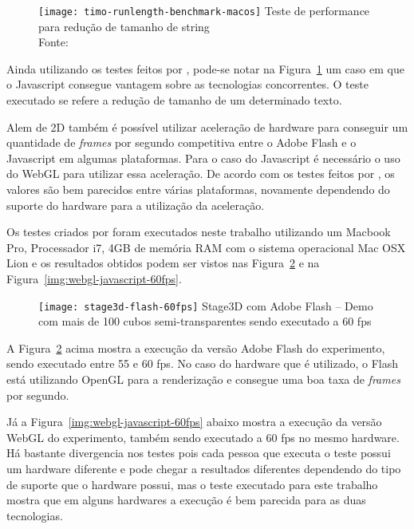 \begin{figure}[H]
  \centering
	\texttt{[image: timo-runlength-benchmark-macos]}
	\footnotesize\hspace{8\baselineskip}
	Teste de performance para redução de tamanho de string \\
	Fonte: 
  \label{img:timo-runlength-benchmark-macos}
\end{figure}

Ainda utilizando os testes feitos por ,
pode-se notar na Figura~\ref{img:timo-runlength-benchmark-macos} um
caso em que o Javascript consegue vantagem sobre as tecnologias
concorrentes. O teste executado se refere a redução de tamanho de um
determinado texto.

Alem de 2D também é possível utilizar aceleração de hardware para conseguir um quantidade
de \textit{frames} por segundo competitiva entre o Adobe Flash e o
Javascript em algumas plataformas. Para o caso do Javascript é necessário o uso do WebGL para
utilizar essa aceleração. De acordo com os testes feitos por
, os valores são bem parecidos entre várias
plataformas, novamente dependendo do suporte do hardware para a
utilização da aceleração.

Os testes criados por  foram executados
neste trabalho utilizando um Macbook Pro, Processador i7, 4GB de memória RAM com o sistema operacional
Mac OSX Lion e os resultados obtidos podem ser vistos nas Figura~\ref{img:stage3d-flash-60fps}
e na Figura~\ref{img:webgl-javascript-60fps}.

\begin{figure}[H]
  \centering
	\texttt{[image: stage3d-flash-60fps]}
	\footnotesize\hspace{8\baselineskip}
	Stage3D com Adobe Flash {--} Demo com mais de 100 cubos semi-transparentes sendo executado a 60 fps
  \label{img:stage3d-flash-60fps}
\end{figure}

A Figura~\ref{img:stage3d-flash-60fps} acima mostra a execução da
versão Adobe Flash do experimento, sendo executado entre 55 e 60 fps.
No caso do hardware que é utilizado, o Flash está utilizando OpenGL
para a renderização e consegue uma boa taxa de \textit{frames} por
segundo.

Já a Figura~\ref{img:webgl-javascript-60fps} abaixo mostra a execução da
versão WebGL do experimento, também sendo executado a 60 fps no mesmo
hardware. Há bastante divergencia nos testes pois cada pessoa que
executa o teste possui um hardware diferente e pode chegar a
resultados diferentes dependendo do tipo de suporte que o hardware
possui, mas o teste executado para este trabalho mostra que em alguns
hardwares a execução é bem parecida para as duas tecnologias.

